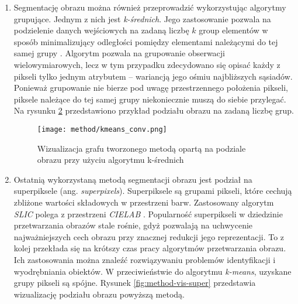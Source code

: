 {{{\begin{enumerate}
                \begin{figure}
                    \centering
                    \texttt{[image: method/window\_conv.png]}
                    \caption{Wizualizacja grafu tworzonego metodą opartą na podziale obrazu na nienachodzące prostokąty}
                    \label{fig:method-vis-window}
                \end{figure}

                \item Segmentację obrazu można również przeprowadzić wykorzystując algorytmy grupujące. Jednym z nich
                jest \textit{k-średnich}. Jego zastosowanie pozwala na podzielenie danych wejściowych na zadaną liczbę
                $k$ group elementów w sposób minimalizujący odległości pomiędzy elementami należącymi do tej samej grupy
                \cite{MacQueen1967SomeMF}. Algorytm pozwala na grupowanie obserwacji wielowymiarowych, lecz w tym
                przypadku zdecydowano się opisać każdy z pikseli tylko jednym atrybutem -- wariancją jego ośmiu
                najbliższych sąsiadów. Ponieważ grupowanie nie bierze pod uwagę przestrzennego położenia pikseli,
                piksele należące do tej samej grupy niekoniecznie muszą do siebie przylegać. Na rysunku
                \ref{fig:method-vis-kmeans} przedstawiono przykład podziału obrazu na zadaną liczbę grup.

                \begin{figure}
                    \centering
                    \texttt{[image: method/kmeans\_conv.png]}
                    \caption{Wizualizacja grafu tworzonego metodą opartą na podziale obrazu przy użyciu algorytmu k-średnich}
                    \label{fig:method-vis-kmeans}
                \end{figure}

                \item Ostatnią wykorzystaną metodą segmentacji obrazu jest podział na superpiksele (ang.
                \textit{superpixels}). Superpiksele są grupami pikseli, które cechują zbliżone wartości składowych w
                przestrzeni barw. Zastosowany algorytm \textit{SLIC} polega z przestrzeni
                \textit{CIELAB} \cite{Achanta2012SLICSC}. Popularność superpikseli w dziedzinie przetwarzania obrazów
                stale rośnie, gdyż pozwalają na uchwycenie najważniejszych cech obrazu przy znacznej redukcji jego
                reprezentacji. To z kolej przekłada się na krótszy czas pracy algorytmów przetwarzania obrazu. Ich
                zastosowania można znaleźć rozwiązywaniu problemów identyfikacji i wyodrębniania obiektów. W
                przeciwieństwie do algorytmu \textit{k-means}, uzyskane grupy pikseli są spójne. Rysunek
                \ref{fig:method-vis-super} przedstawia wizualizację podziału obrazu powyższą metodą.


\end{enumerate}}}}
